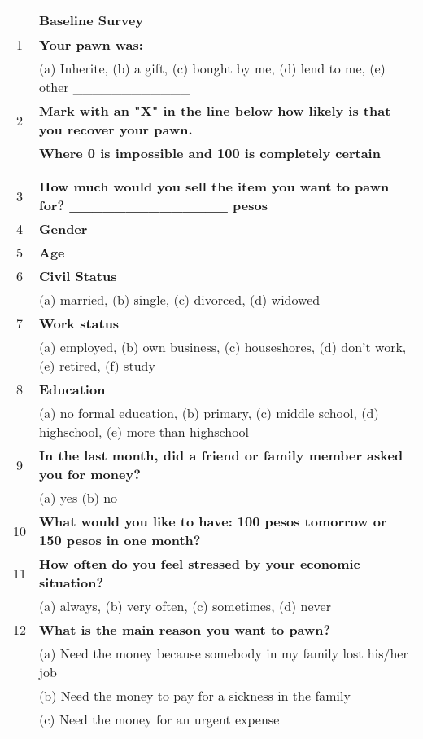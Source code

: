 \begin{tabular}{cl}
\toprule
      & \textbf{Baseline Survey} \\
\midrule
\midrule
1     & \textbf{Your pawn was:} \\
      & (a) Inherite, (b) a gift, (c) bought by me, (d) lend to me, (e) other \_\_\_\_\_\_\_\_\_\_\_\_ \\
2     & \textbf{Mark with an "X" in the line below how likely is that you recover your pawn. } \\
      & \textbf{Where 0 is impossible and 100 is completely certain} \\
      &  \\
      &  \\
3     & \textbf{How much would you sell the item you want to pawn for?       \_\_\_\_\_\_\_\_\_\_\_\_\_\_ pesos} \\
4     & \textbf{Gender      } \\
5     & \textbf{Age} \\
6     & \textbf{Civil Status } \\
      & (a) married, (b) single, (c) divorced, (d) widowed \\
7     & \textbf{Work status} \\
      & (a) employed, (b) own business, (c) houseshores, (d) don't work, (e) retired, (f) study \\
8     & \textbf{Education} \\
      & (a) no formal education, (b) primary, (c) middle school, (d) highschool, (e) more than highschool \\
9     & \textbf{In the last month, did a friend or family member asked you for money?} \\
      & (a) yes  (b) no \\
10    & \textbf{What would you like to have: 100 pesos tomorrow or 150 pesos in one month?} \\
11    & \textbf{How often do you feel stressed by your economic situation?} \\
      & (a) always, (b) very often, (c) sometimes, (d) never \\
12    & \textbf{What is the main reason you want to pawn?} \\
      & (a) Need the money because somebody in my family lost his/her job \\
      & (b) Need the money to pay for a sickness in the family \\
      & (c) Need the money for an urgent expense \\

\end{tabular}

